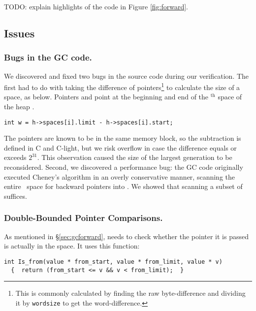 TODO: explain highlights of the code in Figure \ref{fig:forward}.



\subsection{Issues} \label{sec:gcissues}

\subsubsection*{Bugs in the GC code.}
We discovered and fixed two bugs in the source code during our verification. 
The first had to do with taking the difference of pointers\footnote{This is commonly calculated by finding the 
raw byte-difference and dividing it by \texttt{\scriptsize wordsize} to get the word-difference.} 
to calculate the size of a space, as below. Pointers  and  
point at the beginning and end of the $^{\text{th}}$ space of the
heap . 

\begin{lstlisting}[numbers=none]
  int w = h->spaces[i].limit - h->spaces[i].start;
\end{lstlisting}

The pointers are known to be in 
the same memory block, so the subtraction is defined in C and C-light, but
we risk overflow in case the difference equals 
or exceeds $2^{31}$. This observation caused the size of the largest generation 
to be reconsidered. Second, we discovered a performance bug: the GC code 
originally executed Cheney's algorithm in an overly conservative manner, 
scanning the entire~ space for backward pointers into . We
showed that scanning a subset of  suffices.

\subsubsection*{Double-Bounded Pointer Comparisons.}
As mentioned in \S\ref{sec:gcforward},  needs to 
check whether the pointer it is passed is actually in the 
space. It uses this function: 

\begin{lstlisting}[numbers=none]
  int Is_from(value * from_start, value * from_limit, value * v) 
  {  return (from_start <= v && v < from_limit);  }
\end{lstlisting}

